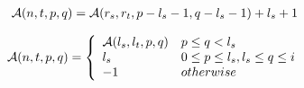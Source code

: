 \begin{eqnarray}  \label{fun:LCA1}
  {\cal A}(n, t, p, q) = {\cal A}(r_s, r_t, p - l_s - 1, q - l_s - 1) + l_s + 1 
\end{eqnarray}


\begin{equation}  \label{fun:LCA2}
    {\cal A}(n, t, p, q) =
    \left\{
    \begin{array}{ll}
      {\cal A}(l_s, l_t, p, q) & p \le q < l_s\\
      l_s & 0 \le p \le l_s, l_s \le q \le i\\
      -1 & \mbox{otherwise} \\
    \end{array}
    \right.
\end{equation}

